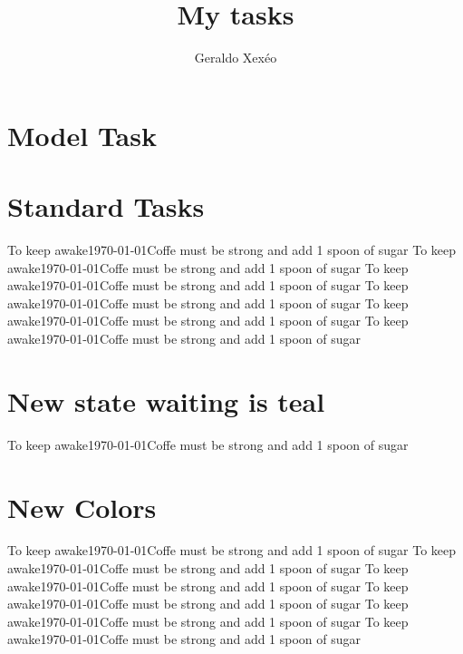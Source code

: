 \documentclass[12pt,a4paper]{article}
\author{Geraldo Xexéo}
\title{My tasks}
\begin{document}
\maketitle

\section{Model Task}

\section{Standard Tasks}
%
{To keep awake}{\today}{Coffe must be strong and add 1 spoon of sugar}
%
{To keep awake}{\today}{Coffe must be strong and add 1 spoon of sugar}
%
{To keep awake}{\today}{Coffe must be strong and add 1 spoon of sugar}
%
{To keep awake}{\today}{Coffe must be strong and add 1 spoon of sugar}
%
{To keep awake}{\today}{Coffe must be strong and add 1 spoon of sugar}
%
{To keep awake}{\today}{Coffe must be strong and add 1 spoon of sugar}

\section{New state waiting is teal}

%
{To keep awake}{\today}{Coffe must be strong and add 1 spoon of sugar}


\section{New Colors}
%
{To keep awake}{\today}{Coffe must be strong and add 1 spoon of sugar}
%
{To keep awake}{\today}{Coffe must be strong and add 1 spoon of sugar}
%
{To keep awake}{\today}{Coffe must be strong and add 1 spoon of sugar}
%
{To keep awake}{\today}{Coffe must be strong and add 1 spoon of sugar}
%
{To keep awake}{\today}{Coffe must be strong and add 1 spoon of sugar}
%
{To keep awake}{\today}{Coffe must be strong and add 1 spoon of sugar}
\end{document}
